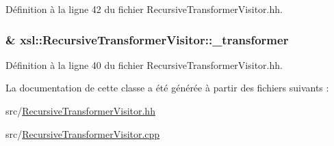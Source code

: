 Définition à la ligne 42 du fichier RecursiveTransformerVisitor.hh.

\hypertarget{classxsl_1_1_recursive_transformer_visitor_a745c0d86fe855949ec55b4c872b02753}{
\subsubsection[{\_\-transformer}]{\& {\bf xsl::RecursiveTransformerVisitor::\_\-transformer}}}
\label{classxsl_1_1_recursive_transformer_visitor_a745c0d86fe855949ec55b4c872b02753}


Définition à la ligne 40 du fichier RecursiveTransformerVisitor.hh.



La documentation de cette classe a été générée à partir des fichiers suivants :\begin{DoxyCompactItemize}
\item 
src/\hyperlink{_recursive_transformer_visitor_8hh}{RecursiveTransformerVisitor.hh}\item 
src/\hyperlink{_recursive_transformer_visitor_8cpp}{RecursiveTransformerVisitor.cpp}\end{DoxyCompactItemize}
